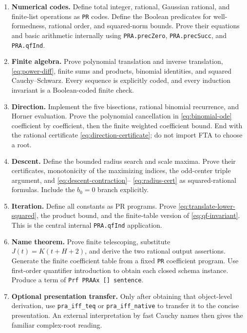 \documentclass[11pt,letterpaper]{article}
\theoremstyle{definition}\newtheorem{definition}[theorem]{Definition}
\theoremstyle{remark}\newtheorem{remark}[theorem]{Remark}
\begin{document}
\begin{enumerate}
\item \textbf{Numerical codes.} Define total integer, rational, Gaussian
rational, and finite-list operations as \texttt{PR} codes. Define the
Boolean predicates for well-formedness, rational order, and squared-norm
bounds. Prove their equations and basic arithmetic internally using
\texttt{PRA.precZero}, \texttt{PRA.precSucc}, and \texttt{PRA.qfInd}.

\item \textbf{Finite algebra.} Prove polynomial translation and inverse
translation, \eqref{eq:power-diff}, finite sums and products, binomial
identities, and squared Cauchy--Schwarz. Every sequence is explicitly coded,
and every induction invariant is a Boolean-coded finite check.

\item \textbf{Direction.} Implement the five bisections, rational binomial
recurrence, and Horner evaluation. Prove the polynomial cancellation in
\eqref{eq:binomial-ode} coefficient by coefficient, then the finite
weighted coefficient bound. End with the rational certificate
\eqref{eq:direction-certificate}; do not import FTA to choose a root.

\item \textbf{Descent.} Define the bounded radius search and scale maxima.
Prove their certificates, monotonicity of the maximizing indices, the
odd-center triple argument, and \eqref{eq:descent-contraction}--
\eqref{eq:radius-cert} as squared-rational formulas. Include the
$b_0=0$ branch explicitly.

\item \textbf{Iteration.} Define all constants as PR programs. Prove
\eqref{eq:translate-lower-squared}, the product bound, and the finite-table
version of \eqref{eq:qf-invariant}. This is the central internal
\texttt{PRA.qfInd} application.

\item \textbf{Name theorem.} Prove finite telescoping, substitute
$J(t)=K(t+H+2)$, and derive the two rational output assertions. Generate
the finite coefficient table from a fixed \texttt{PR} coefficient program.
Use first-order quantifier introduction to obtain each closed schema
instance. Produce a term of \texttt{Prf PRAAx [] sentence}.

\item \textbf{Optional presentation transfer.} Only after obtaining that
object-level derivation, use \texttt{pra\_iff\_teq} or
\texttt{pra\_iff\_native} to transfer it to the concise presentation.
An external interpretation by fast Cauchy names then gives the familiar
complex-root reading.
\end{enumerate}
\end{document}

